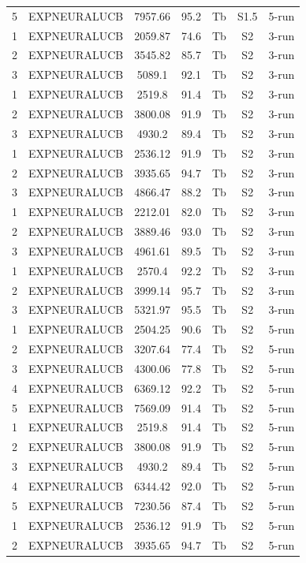 \documentclass[11pt]{article}
\begin{document}
\begin{center}
\begin{longtable}{|c|c|c|c|c|c|c|}
5 & EXPNEURALUCB & 7957.66 & 95.2 & Tb & S1.5 & 5-run \\
1 & EXPNEURALUCB & 2059.87 & 74.6 & Tb & S2 & 3-run \\
2 & EXPNEURALUCB & 3545.82 & 85.7 & Tb & S2 & 3-run \\
3 & EXPNEURALUCB & 5089.1 & 92.1 & Tb & S2 & 3-run \\
1 & EXPNEURALUCB & 2519.8 & 91.4 & Tb & S2 & 3-run \\
2 & EXPNEURALUCB & 3800.08 & 91.9 & Tb & S2 & 3-run \\
3 & EXPNEURALUCB & 4930.2 & 89.4 & Tb & S2 & 3-run \\
1 & EXPNEURALUCB & 2536.12 & 91.9 & Tb & S2 & 3-run \\
2 & EXPNEURALUCB & 3935.65 & 94.7 & Tb & S2 & 3-run \\
3 & EXPNEURALUCB & 4866.47 & 88.2 & Tb & S2 & 3-run \\
1 & EXPNEURALUCB & 2212.01 & 82.0 & Tb & S2 & 3-run \\
2 & EXPNEURALUCB & 3889.46 & 93.0 & Tb & S2 & 3-run \\
3 & EXPNEURALUCB & 4961.61 & 89.5 & Tb & S2 & 3-run \\
1 & EXPNEURALUCB & 2570.4 & 92.2 & Tb & S2 & 3-run \\
2 & EXPNEURALUCB & 3999.14 & 95.7 & Tb & S2 & 3-run \\
3 & EXPNEURALUCB & 5321.97 & 95.5 & Tb & S2 & 3-run \\
1 & EXPNEURALUCB & 2504.25 & 90.6 & Tb & S2 & 5-run \\
2 & EXPNEURALUCB & 3207.64 & 77.4 & Tb & S2 & 5-run \\
3 & EXPNEURALUCB & 4300.06 & 77.8 & Tb & S2 & 5-run \\
4 & EXPNEURALUCB & 6369.12 & 92.2 & Tb & S2 & 5-run \\
5 & EXPNEURALUCB & 7569.09 & 91.4 & Tb & S2 & 5-run \\
1 & EXPNEURALUCB & 2519.8 & 91.4 & Tb & S2 & 5-run \\
2 & EXPNEURALUCB & 3800.08 & 91.9 & Tb & S2 & 5-run \\
3 & EXPNEURALUCB & 4930.2 & 89.4 & Tb & S2 & 5-run \\
4 & EXPNEURALUCB & 6344.42 & 92.0 & Tb & S2 & 5-run \\
5 & EXPNEURALUCB & 7230.56 & 87.4 & Tb & S2 & 5-run \\
1 & EXPNEURALUCB & 2536.12 & 91.9 & Tb & S2 & 5-run \\
2 & EXPNEURALUCB & 3935.65 & 94.7 & Tb & S2 & 5-run \\

\end{longtable}
\end{center}
\end{document}
